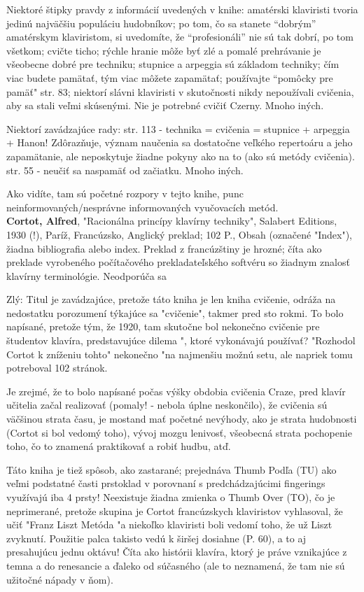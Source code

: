 \documentclass[11pt,a4paper%
]{article}
\begin{document}
Niektoré štipky pravdy z informácií uvedených v knihe: amatérski klaviristi tvoria jedinú najväčšiu populáciu hudobníkov; po tom, čo sa stanete “dobrým” amatérskym klaviristom, si uvedomíte, že “profesionáli” nie sú tak dobrí, po tom všetkom; cvičte ticho; rýchle hranie môže byť zlé a pomalé prehrávanie je všeobecne dobré pre techniku; stupnice a arpeggia sú základom techniky; čím viac budete pamätať, tým viac môžete zapamätať; používajte “pomôcky pre pamäť" str. 83; niektorí slávni klaviristi v skutočnosti nikdy nepoužívali cvičenia, aby sa stali veľmi skúsenými. Nie je potrebné cvičiť Czerny. Mnoho iných.

Niektorí zavádzajúce rady: str. 113 - technika = cvičenia = stupnice + arpeggia + Hanon! Zdôrazňuje, význam naučenia sa dostatočne veľkého repertoáru a jeho zapamätanie, ale neposkytuje žiadne pokyny ako na to (ako sú metódy cvičenia). str. 55 - neučiť sa naspamäť od začiatku. Mnoho iných.

Ako vidíte, tam sú početné rozpory v tejto knihe, punc neinformovaných/nesprávne informovaných vyučovacích metód.
\medskip\\
\textbf{Cortot, Alfred}, "Racionálna princípy klavírny techniky", Salabert Editions, 1930 (!), Paríž, Francúzsko, Anglický preklad; 102 P., Obsah (označené "Index"), žiadna bibliografia alebo index. Preklad z francúzštiny je hrozné; číta ako preklade vyrobeného počítačového prekladateľského softvéru so žiadnym znalosť klavírny terminológie. Neodporúča sa

Zlý: Titul je zavádzajúce, pretože táto kniha je len kniha cvičenie, odráža na nedostatku porozumení týkajúce sa "cvičenie", takmer pred sto rokmi. To bolo napísané, pretože tým, že 1920, tam skutočne bol nekonečno cvičenie pre študentov klavíra, predstavujúce dilema ", ktoré vykonávajú používať? "Rozhodol Cortot k zníženiu tohto" nekonečno "na najmenšiu možnú setu, ale napriek tomu potreboval 102 stránok. 

Je zrejmé, že to bolo napísané počas výšky obdobia cvičenia Craze, pred klavír učitelia začal realizovať (pomaly! - nebola úplne neskončilo), že cvičenia sú väčšinou strata času, je mostand mať početné nevýhody, ako je strata hudobnosti (Cortot si bol vedomý toho), vývoj mozgu lenivosť, všeobecná strata pochopenie toho, čo to znamená praktikovať a robiť hudbu, atď.

Táto kniha je tiež spôsob, ako zastarané; prejednáva Thumb Podľa (TU) ako veľmi podstatné časti prstoklad v porovnaní s predchádzajúcimi fingerings využívajú iba 4 prsty! Neexistuje žiadna zmienka o Thumb Over (TO), čo je neprimerané, pretože skupina je Cortot francúzskych klaviristov vyhlasoval, že učiť "Franz Liszt Metóda "a niekoľko klaviristi boli vedomí toho, že už Liszt zvyknutí. Použitie palca takisto vedú k širšej dosiahne (P. 60), a to aj presahujúcu jednu oktávu! Číta ako histórii klavíra, ktorý je práve vznikajúce z temna a do renesancie a ďaleko od súčasného (ale to neznamená, že tam nie sú užitočné nápady v ňom).
\end{document}
